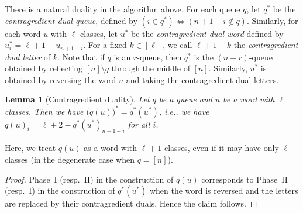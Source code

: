 \documentclass[reqno]{amsart}
\newcommand{\0}{\phantom{c}}
\DeclareMathOperator{\inter}{int} %
\newcommand{\tup}[1]{\left( #1 \right)}
\newcommand{\ive}[1]{\left[ #1 \right]}
\newcommand{\defn}[1]{{\color{darkred}\emph{#1}}} %
\theoremstyle{plain}
\newtheorem{lemma}[thm]{Lemma}
\theoremstyle{definition}
\newtheorem{remark}[thm]{Remark}
\numberwithin{equation}{section}
\begin{document}
There is a natural duality in the algorithm above.
For each queue $q$, let $q^*$ be the \defn{contragredient dual queue}, defined by $\tup{i \in q^*} \Longleftrightarrow \tup{n+1-i \notin q}$.
Similarly, for each word $u$ with $\ell$ classes, let $u^*$ be the \defn{contragredient dual word} defined by $u^*_i = \ell + 1 - u_{n+1-i}$.
For a fixed $k \in \ive{\ell}$, we call $\ell + 1 - k$ the \defn{contragredient dual letter} of $k$.
Note that if $q$ is an $r$-queue, then $q^*$ is the $(n-r)$-queue obtained by reflecting $[n] \setminus q$ through the middle of $[n]$.
Similarly, $u^*$ is obtained by reversing the word $u$ and taking the contragredient dual letters.

\begin{lemma}[Contragredient duality]
  \label{le:dual}
  Let $q$ be a queue and $u$ be a word with $\ell$ classes.
  Then we have $\bigl(q(u) \bigr)^* = q^*(u^*)$, \textit{i.e.}, we have $q(u)_i = \ell + 2 - q^*(u^*)_{n+1-i}$ for all $i$.
\end{lemma}

Here, we treat $q(u)$ as a word with $\ell+1$ classes, even if it may have only $\ell$ classes (in the degenerate case when $q = \ive{n}$).

\begin{proof}
Phase~I (resp.~II) in the construction of $q(u)$ corresponds to Phase~II (resp.~I) in the construction of $q^*(u^*)$ when the word is reversed and the letters are replaced by their contragredient duals.
Hence the claim follows.
\end{proof}

\end{document}

